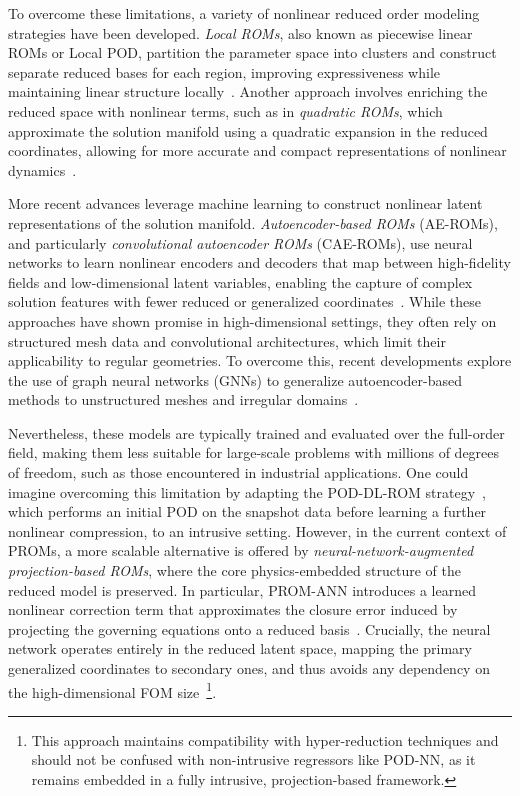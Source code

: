 To overcome these limitations, a variety of nonlinear reduced order modeling strategies have been developed. \textit{Local ROMs}, also known as piecewise linear ROMs or Local POD, partition the parameter space into clusters and construct separate reduced bases for each region, improving expressiveness while maintaining linear structure locally~\cite{amsallem2012nonlinear, grimberg2021mesh}. Another approach involves enriching the reduced space with nonlinear terms, such as in \textit{quadratic ROMs}, which approximate the solution manifold using a quadratic expansion in the reduced coordinates, allowing for more accurate and compact representations of nonlinear dynamics~\cite{barnett2022quadratic}.

More recent advances leverage machine learning to construct nonlinear latent representations of the solution manifold. \textit{Autoencoder-based ROMs} (AE-ROMs), and particularly \textit{convolutional autoencoder ROMs} (CAE-ROMs), use neural networks to learn nonlinear encoders and decoders that map between high-fidelity fields and low-dimensional latent variables, enabling the capture of complex solution features with fewer reduced or generalized coordinates~\cite{lee2020model, romor2023non}. While these approaches have shown promise in high-dimensional settings, they often rely on structured mesh data and convolutional architectures, which limit their applicability to regular geometries. To overcome this, recent developments explore the use of graph neural networks (GNNs) to generalize autoencoder-based methods to unstructured meshes and irregular domains~\cite{gao2022physics}.

Nevertheless, these models are typically trained and evaluated over the full-order field, making them less suitable for large-scale problems with millions of degrees of freedom, such as those encountered in industrial applications. One could imagine overcoming this limitation by adapting the POD-DL-ROM strategy~\cite{FRESCA2022114181}, which performs an initial POD on the snapshot data before learning a further nonlinear compression, to an intrusive setting. However, in the current context of PROMs, a more scalable alternative is offered by \textit{neural-network-augmented projection-based ROMs}, where the core physics-embedded structure of the reduced model is preserved. In particular, PROM-ANN introduces a learned nonlinear correction term that approximates the closure error induced by projecting the governing equations onto a reduced basis~\cite{barnett2023neural, chmiel2025unified}. Crucially, the neural network operates entirely in the reduced latent space, mapping the primary generalized coordinates to secondary ones, and thus avoids any dependency on the high-dimensional FOM size~\footnote{This approach maintains compatibility with hyper-reduction techniques and should not be confused with non-intrusive regressors like POD-NN, as it remains embedded in a fully intrusive, projection-based framework.}.

